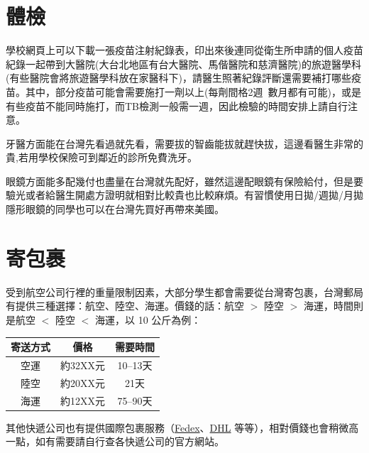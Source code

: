 \documentclass[10pt,a4paper]{book}
\begin{document}
\begin{CJK}{UTF8}{bkai}
\section{體檢}

學校網頁上可以下載一張疫苗注射紀錄表，印出來後連同從衛生所申請的個人疫苗紀錄一起帶到大醫院(大台北地區有台大醫院、馬偕醫院和慈濟醫院)的旅遊醫學科(有些醫院會將旅遊醫學科放在家醫科下)，請醫生照著紀錄評斷還需要補打哪些疫苗。其中，部分疫苗可能會需要施打一劑以上(每劑間格2週~數月都有可能)，或是有些疫苗不能同時施打，而TB檢測一般需一週，因此檢驗的時間安排上請自行注意。

牙醫方面能在台灣先看過就先看，需要拔的智齒能拔就趕快拔，這邊看醫生非常的貴,若用學校保險可到鄰近的診所免費洗牙。

眼鏡方面能多配幾付也盡量在台灣就先配好，雖然這邊配眼鏡有保險給付，但是要驗光或者給醫生開處方證明就相對比較貴也比較麻煩。有習慣使用日拋/週拋/月拋隱形眼鏡的同學也可以在台灣先買好再帶來美國。

\section{寄包裹}

受到航空公司行裡的重量限制因素，大部分學生都會需要從台灣寄包裹，台灣郵局有提供三種選擇：航空、陸空、海運。價錢的話：航空 $>$ 陸空 $>$ 海運，時間則是航空 $<$ 陸空 $<$ 海運，以 10 公斤為例：

\begin{center}
\begin{tabular}{c c c}
\hline
寄送方式 & 價格 & 需要時間\\
\hline
空運 & 約32XX元 & 10--13天\\
陸空 & 約20XX元 & 21天\\
海運 & 約12XX元 & 75--90天\\
\hline
\end{tabular}
\end{center}

其他快遞公司也有提供國際包裹服務（\href{http://www.fedex.com/tw/}{Fedex}、\href{http://www.dhl.com.tw/zt.html}{DHL} 等等），相對價錢也會稍微高一點，如有需要請自行查各快遞公司的官方網站。


\end{CJK}
\end{document}
